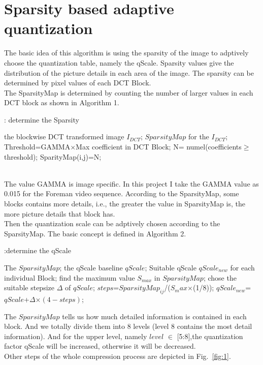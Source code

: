 \documentclass[twocolumn]{article}  %
\begin{document}
\section {Sparsity based adaptive quantization}
The basic idea of this algorithm is using the sparsity of the image to adptively choose the quantization table, namely the qScale. Sparsity values give the distribution of the picture details in each area of the image. The sparsity can be determined by pixel values of each DCT Block. 
\\
The SparsityMap is determined by counting the number of larger values in each DCT block as shown in Algorithm 1.
\begin{algorithm}[h]  
  \caption{: determine the Sparsity}
	\begin{algorithmic}
	\Require
      the blockwise DCT transformed image  $I_{DCT}$;
    \Ensure
     	 $SparsityMap$ for the $I_{DCT}$;
      \State Threshold=GAMMA$\times$Max coefficient in DCT Block;
      \State N= numel(coefficients$\geqslant$threshold);
	\State SparityMap(i,j)=N;
    \EndFor	
	\end{algorithmic}
\end{algorithm} 
\\
The value GAMMA is image specific. In this project I take the GAMMA value as 0.015 for the Foreman video sequence.  
According to the SparsityMap, some blocks contains more details, i.e., the greater the value in SparsityMap is, the more picture details that block has. \\
Then the quantization scale can be adptively chosen according to the SparsityMap. The basic concept is defined in Algorithm 2.

\begin{algorithm}[!h]  
  \caption{:determine the qScale}
	\begin{algorithmic}
	\Require
      The $SparsityMap$;
      the qScale baseline $qScale$;
    \Ensure
     	 Suitable qScale $qScale_{new}$ for each individual Block;
	\State
	find the maximum value $S_{max}$ in $SparsityMap$; 
	\For{$SparsityMap_{ij} \in SparsityMap$}
	\State chose the suitable stepsize  $\Delta$ of $qScale$;
     \State $steps$=$SparsityMap_{ij}$/($S_max$$\times$(1/8));
	\State $qScale_{new}$= $qScale$+$\Delta$$\times$$(4-steps)$;
    \EndFor	
	\end{algorithmic}
\end{algorithm} 
The $SparsityMap$ tells us how much detailed information is contained in each block. And we totally divide them into 8 levels (level 8 contains the most detail information). And for the upper level, namely $level$ $\in$ [5:8],the quantization factor qScale will be increased, otherwise it will be decreased.     
\\
Other steps of the whole compression process are depicted in Fig.~\ref{fig:1}. 
\end{document}
